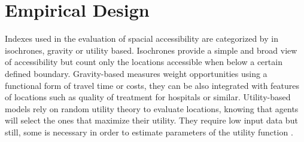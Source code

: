 \documentclass[12pt]{article}
\begin{document}
\section{Empirical Design}
\label{edesign}
Indexes used in the evaluation of spacial accessibility are categorized by \cite{marwal_literature_2022} in isochrones, gravity or utility based. Isochrones provide a simple and broad view of accessibility but count only the locations accessible when below a certain defined boundary. Gravity-based measures weight opportunities using a functional form of travel time or costs, they can be also integrated with features of locations such as quality of treatment for hospitals or similar. Utility-based models rely on random utility theory to evaluate locations, knowing that agents will select the ones that maximize their utility. They require low input data but still, some is necessary in order to estimate parameters of the utility function \parencite{ziemke_accessibility_2018}.
\end{document}
